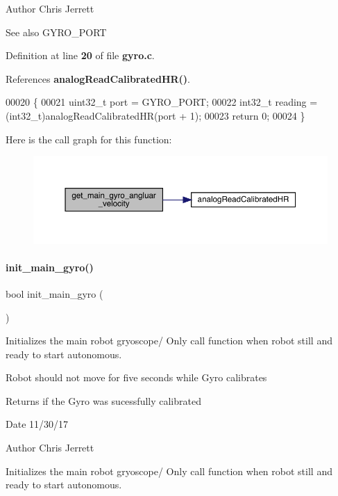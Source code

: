 \begin{DoxyAuthor}{Author}
Chris Jerrett 
\end{DoxyAuthor}
\begin{DoxySeeAlso}{See also}
G\+Y\+R\+O\+\_\+\+P\+O\+RT 
\end{DoxySeeAlso}


Definition at line \textbf{ 20} of file \textbf{ gyro.\+c}.



References \textbf{ analog\+Read\+Calibrated\+H\+R()}.


\begin{DoxyCode}
00020                                        \{
00021   uint32\_t port = GYRO\_PORT;
00022   int32\_t reading = (int32\_t)analogReadCalibratedHR(port + 1);
00023   \textcolor{keywordflow}{return} 0;
00024 \}
\end{DoxyCode}
Here is the call graph for this function\+:
\nopagebreak
\begin{figure}[H]
\begin{center}
\leavevmode
\includegraphics[width=350pt]{gyro_8h_aec0963ebe3eb6cdfd7edaf486bbb0a87_cgraph}
\end{center}
\end{figure}
\mbox{\label{gyro_8h_a47c0a78a867be91a28e278bf433d699c}} 
\paragraph{init\+\_\+main\+\_\+gyro()}
{\footnotesize\ttfamily bool init\+\_\+main\+\_\+gyro (\begin{DoxyParamCaption}{ }\end{DoxyParamCaption})}



Initializes the main robot gryoscope/ Only call function when robot still and ready to start autonomous. 

Robot should not move for five seconds while Gyro calibrates \begin{DoxyReturn}{Returns}
if the Gyro was sucessfully calibrated 
\end{DoxyReturn}
\begin{DoxyDate}{Date}
11/30/17 
\end{DoxyDate}
\begin{DoxyAuthor}{Author}
Chris Jerrett
\end{DoxyAuthor}
Initializes the main robot gryoscope/ Only call function when robot still and ready to start autonomous.

